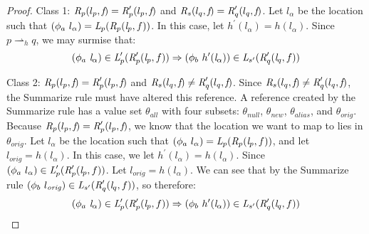 \begin{proof}
Class 1: $\emph{R}_{p} ( l_{p},  \emph{f} ) = \emph{R}_{p}^\prime ( l_{p},  \emph{f} )$ and $\emph{R}_{s} ( l_{q},  \emph{f} ) = \emph{R}_{q}^\prime ( l_{q},  \emph{f})$.  Let $l_\alpha$ be the location such that ${(\phi_a\ l_\alpha)} = \cfgnt{L}_{p}(\cfgnt{R}_{p} (\cfgnt{l}_{p},f )) $. In this case, let $h^\prime(l_\alpha) = h(l_\alpha)$. Since $p \rightharpoonup_h {q}$, we may surmise that: 
$$(\phi_a\ \cfgnt{l}_\alpha) \in \cfgnt{L}_{p}^\prime(\cfgnt{R}_{p}^\prime (\cfgnt{l}_{p},f )) \Rightarrow (\phi_b\ h^\prime (\cfgnt{l}_\alpha))\in \cfgnt{L}_{s^\prime}(\cfgnt{R}_{q}^\prime (\cfgnt{l}_{q},f ))$$

Class 2: $\emph{R}_{p} ( l_{p},  \emph{f}) = \emph{R}_{p}^\prime ( l_{p},  \emph{f})$ and $\emph{R}_{s} ( l_{q},  \emph{f}) \neq \emph{R}_{q}^\prime ( l_{q},  \emph{f})$. Since $\emph{R}_{s} ( l_{q},  \emph{f}) \neq \emph{R}_{q}^\prime ( l_{q},  \emph{f})$, the Summarize rule must have altered this reference. A reference created by the Summarize rule has a value set $\theta_{all}$ with four subsets: $\theta_{null}$, $\theta_{new}$, $\theta_{alias}$, and $\theta_\mathit{orig}$. Because $\emph{R}_{p} ( l_{p},  \emph{f}) = \emph{R}_{p}^\prime ( l_{p},  \emph{f})$, we know that the location we want to map to lies in $\theta_\mathit{orig}$. Let $l_\alpha$ be the location such that ${(\phi_a\ l_\alpha)} = \cfgnt{L}_{p}(\cfgnt{R}_{p} (\cfgnt{l}_{p},f )) $, and let $l_{orig} = h(l_\alpha)$. In this case, we let $h^\prime(l_\alpha) = h(l_\alpha)$. Since $(\phi_a\ l_\alpha) \in \emph{L}_{p}^\prime(\emph{R}_{p}^\prime (\emph{l}_{p},f ))$. Let $l_{orig} = h(l_\alpha)$. We can see that by the Summarize rule $ (\phi_b\ l_\mathit{orig})\in \emph{L}_{s^\prime}(\emph{R}_{q}^\prime (\emph{l}_{q},f ))$, so therefore:
$$(\phi_a\ \cfgnt{l}_\alpha) \in \cfgnt{L}_{p}^\prime(\cfgnt{R}_{p}^\prime (\cfgnt{l}_{p},f )) \Rightarrow (\phi_b\ h^\prime (\cfgnt{l}_\alpha))\in \cfgnt{L}_{s^\prime}(\cfgnt{R}_{q}^\prime (\cfgnt{l}_{q},f ))$$


\end{proof}
